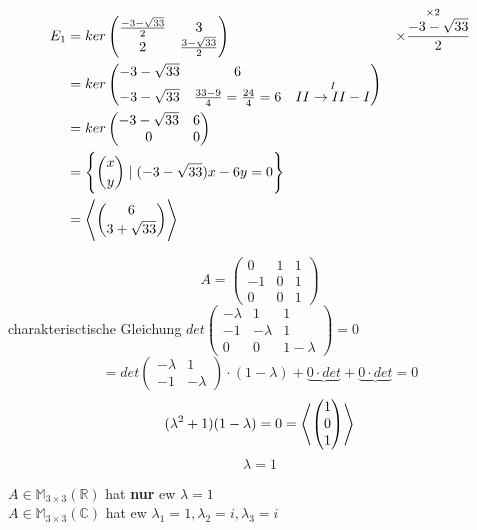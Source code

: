 \documentclass[9pt]{article} %
\begin{document}
\begin{bsp}
\begin{align*}
     E_1 & = ker \begin{pmatrix}
     \frac{-3 -\sqrt{33}}{2} & 3 \\ 2 & \frac{3 - \sqrt{33}}{2} 
     \end{pmatrix} & \overset{\times 2}{\times \frac{-3 -\sqrt{33}}{2}} \\
     & = ker\begin{pmatrix}
    -3 -\sqrt{33}& 6 \\ -3 -\sqrt{33} & \frac{33-9}{4} = \frac{24}{4} = 6  & \overset{I}{II \rightarrow II-I} 
     \end{pmatrix} \\
     & = ker \begin{pmatrix}
     -3 -\sqrt{33} & 6 \\ 0 & 0
    \end{pmatrix} \\
    & = \Biggl\{\binom{x}{y} \mid (-3 -\sqrt{33}) x - 6 y = 0 \Biggl\} \\
    & = \Biggl \langle \binom{6}{3 + \sqrt{33}} \Biggr \rangle
 \end{align*}
   \end{bsp}
   \begin{bsp}
    \[
    A = \begin{pmatrix}
    0 & 1 & 1 \\ -1 & 0 & 1 \\ 0 & 0 & 1
    \end{pmatrix}
    \]
    charakterisctische Gleichung  $det \begin{pmatrix}
    -\lambda & 1 & 1 \\ -1 & -\lambda  & 1 \\
    0 & 0 & 1 -\lambda 
    \end{pmatrix} = 0$
    \[
    = det \begin{pmatrix}
    -\lambda & 1 \\ -1 & -\lambda 
    \end{pmatrix} \cdot (1-\lambda) + \underbrace{0 \cdot det} + \underbrace{0 \cdot det} = 0
    \] 
    \[
    (\lambda^2 +1) (1-\lambda) = 0 = \Biggl \langle \begin{pmatrix}
    1 \\ 0 \\ 1
    \end{pmatrix} \Biggr \rangle
    \]
    \[\lambda = 1\]
   \end{bsp}
   $A \in \mathbb{M}_{3\times3}(\mathbb{R})$ hat \textbf{nur} \gls{ew} $\lambda = 1$ \\
   $A \in \mathbb{M}_{3\times3}(\mathbb{C})$ hat \gls{ew} $\lambda_1 = 1, \lambda_2 = i, \lambda_3 = i$
   
\end{document}

